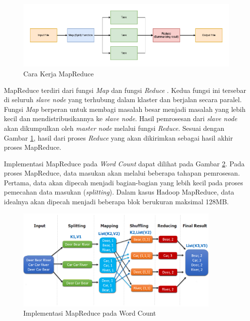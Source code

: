\begin{figure}[h!]
    \centering
    \includegraphics[width=1\textwidth]{figures/ch02/mapreduce-scheme.png}
    \caption{Cara Kerja MapReduce}
    \label{fig:mapreduce-flow}
\end{figure}

MapReduce terdiri dari fungsi \textit{Map} dan fungsi \textit{Reduce} \cite{gandomiHybSMRPHybridScheduling2019}. Kedua fungsi ini tersebar di seluruh \textit{slave node} yang terhubung dalam klaster dan berjalan secara paralel. Fungsi \textit{Map} berperan untuk membagi masalah besar menjadi masalah yang lebih kecil dan mendistribusikannya ke \textit{slave node}. Hasil pemrosesan dari \textit{slave node} akan dikumpulkan oleh \textit{master node} melalui fungsi \textit{Reduce}. Sesuai dengan Gambar \ref{fig:mapreduce-flow}, hasil dari proses \textit{Reduce} yang akan dikirimkan sebagai hasil akhir proses MapReduce.  

Implementasi MapReduce pada \textit{Word Count}\cite{KOMPARASIKECEPATANHADOOP} dapat dilihat pada Gambar \ref{fig:mapreduce-wordcount}. Pada proses MapReduce, data masukan akan melalui beberapa tahapan pemrosesan. Pertama, data akan dipecah menjadi bagian-bagian yang lebih kecil pada proses pemecahan data masukan (\textit{splitting}). Dalam kasus Hadoop MapReduce, data idealnya akan dipecah menjadi beberapa blok berukuran maksimal 128MB.

\begin{figure}[h!]
    \centering
    \includegraphics[width=0.9\textwidth]{figures/ch02/map-reduce-word-count-oreilly.png}
    \caption{Implementasi MapReduce pada Word Count \cite{MapReduceDistributedComputing}}
    \label{fig:mapreduce-wordcount}
\end{figure}

